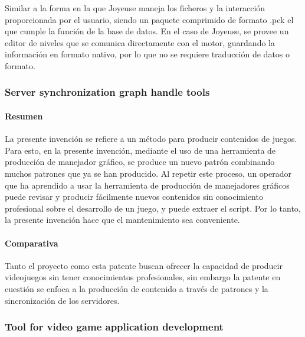 \documentclass[]{article}
\begin{document}
Similar a la forma en la que Joyeuse maneja los ficheros y la interacci\'on proporcionada por el usuario, siendo un paquete comprimido de formato .pck el que cumple la funci\'on de la base de datos. En el caso de Joyeuse, se provee un editor de niveles que se comunica directamente con el motor, guardando la informaci\'on en formato nativo, por lo que no se requiere traducci\'on de datos o formato. 





\subsubsection{Server synchronization graph handle tools}
\paragraph{Resumen} 
La presente invenci\'on se refiere a un m\'etodo para producir contenidos de juegos. Para esto, en la presente invenci\'on, mediante el uso de una herramienta de producci\'on de manejador gr\'afico, se produce un nuevo patr\'on combinando muchos patrones que ya se han producido. Al repetir este proceso, un operador que ha aprendido a usar la herramienta de producci\'on de manejadores gr\'aficos puede revisar y producir f\'acilmente nuevos contenidos sin conocimiento profesional sobre el desarrollo de un juego, y puede extraer el script. Por lo tanto, la presente invenci\'on hace que el mantenimiento sea conveniente.
\cite{Server}
\paragraph{Comparativa}
Tanto el proyecto como esta patente buscan ofrecer la capacidad de producir videojuegos sin tener conocimientos profesionales, sin embargo la patente en cuesti\'on se enfoca a la producci\'on de contenido a trav\'es de patrones y la sincronizaci\'on de los servidores. 














\subsubsection{Tool for video game application development}
\end{document}

